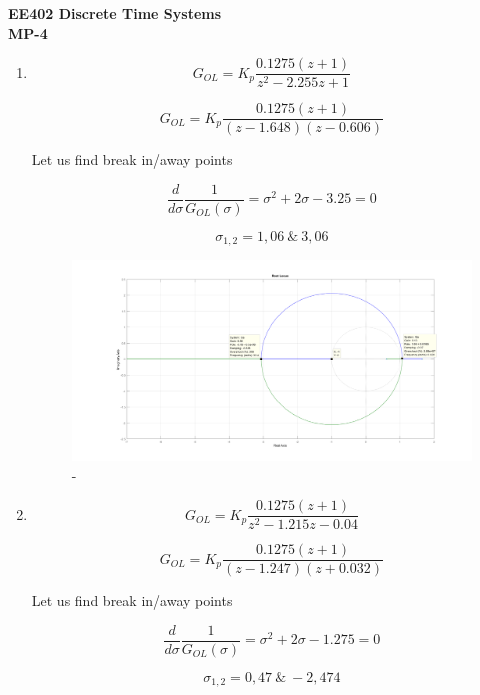\documentclass[a4paper,12pt]{article}
\begin{document}
\begin{center}
	\textbf{\large EE402 Discrete Time Systems \\[0.2cm] MP-4} \\
\end{center}


\begin{enumerate}
	\item 
		
		$$ G_{OL}=K_p\frac{0.1275(z+1)}{z^2-2.255z+1} $$
		
		$$ 	G_{OL}=K_p\frac{0.1275(z+1)}{(z-1.648)(z-0.606)} $$
		
		Let us find break in/away points		
		
		$$ \frac{d}{d\sigma}\frac{1}{G_{OL}(\sigma)}=\sigma^2 +2\sigma-3.25=0$$
		
		$$ \sigma_{1,2}=1,06\ \& \ 3,06$$
		
		
	
	\begin{figure}[H]
			\center
			\setlength{\unitlength}{\textwidth} 
		\includegraphics[width=1.0\unitlength]{images/1}
  		\caption{\label{fig:a}-}
	\end{figure}
	
	\item 
		
		$$ G_{OL}=K_p\frac{0.1275(z+1)}{z^2-1.215z-0.04} $$
		
		$$ 	G_{OL}=K_p\frac{0.1275(z+1)}{(z-1.247)(z+0.032)} $$
		

		Let us find break in/away points		
		
		$$ \frac{d}{d\sigma}\frac{1}{G_{OL}(\sigma)}=\sigma^2 +2\sigma-1.275=0$$		
		
		$$ \sigma_{1,2}=0,47\ \& \ -2,474$$
		
		
	

\end{enumerate}
\end{document}
